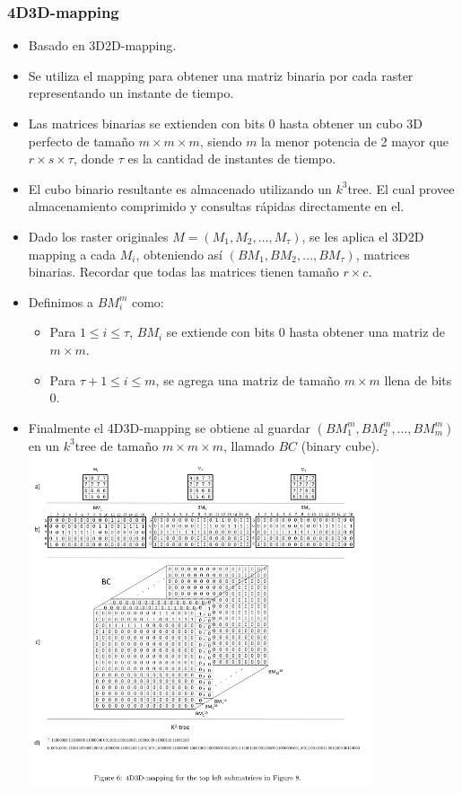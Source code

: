 \documentclass{article}
\begin{document}
\subsubsection*{4D3D-mapping}
\begin{itemize}
  \item Basado en 3D2D-mapping.
  \item Se utiliza el mapping para obtener una matriz binaria por cada raster
    representando un instante de tiempo.
  \item Las matrices binarias se extienden con bits 0 hasta obtener un cubo 3D
    perfecto de tamaño $m \times m \times m$, siendo $m$ la menor potencia de 2
    mayor que $r \times s \times \tau$, donde $\tau$ es la cantidad de instantes
    de tiempo.
  \item El cubo binario resultante es almacenado utilizando un $k^3$tree. El
    cual provee almacenamiento comprimido y consultas rápidas directamente en el.
  \item Dado los raster originales $M = (M_1,M_2,\ldots,M_\tau)$, se les aplica
    el 3D2D mapping a cada $M_i$, obteniendo así $(BM_1,BM_2,\ldots,BM_\tau)$,
    matrices binarias. Recordar que todas las matrices tienen tamaño $r\times c$.
  \item Definimos a $BM^m_i$ como:
    \begin{itemize}
      \item Para $1 \le i \le \tau$, $BM_i$ se extiende con bits 0 hasta obtener
        una matriz de $m \times m$.
      \item Para $\tau + 1 \le i \le m$, se agrega una matriz de tamaño
        $m \times m$ llena de bits 0.
    \end{itemize}
  \item Finalmente el 4D3D-mapping se obtiene al guardar $(BM_1^m,BM_2^m,\ldots,
    BM_m^m)$ en un $k^3$tree de tamaño $m \times m \times m$, llamado $BC$
    (binary cube).
      \centering
      \includegraphics[width=0.8\textwidth]{../images/4d3d.png}

\end{itemize}
\end{document}
